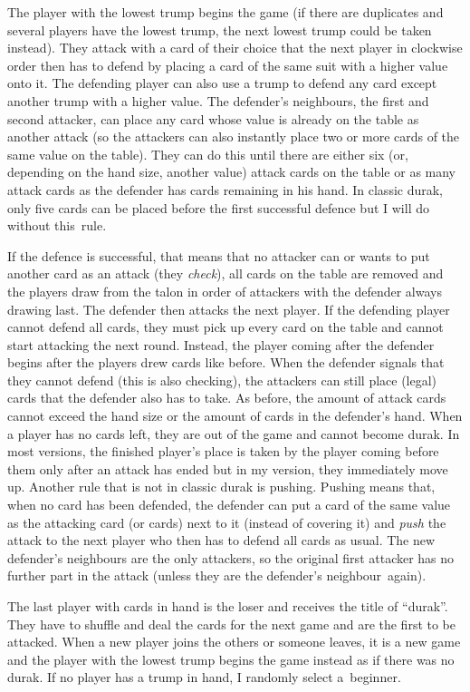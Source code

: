 \documentclass[a4paper,titlepage]{article}
\begin{document}
The player with the lowest trump begins the game (if there are duplicates and several players have the lowest trump, the next lowest trump could be taken instead). They attack with a card of their choice that the next player in clockwise order then has to defend by placing a card of the same suit with a higher value onto it. The defending player can also use a trump to defend any card except another trump with a higher value. The defender's neighbours, the first and second attacker, can place any card whose value is already on the table as another attack (so the attackers can also instantly place two or more cards of the same value on the table). They can do this until there are either six (or, depending on the hand size, another value) attack cards on the table or as many attack cards as the defender has cards remaining in his hand. In classic durak, only five cards can be placed before the first successful defence but I will do without this~rule.

If the defence is successful, that means that no attacker can or wants to put another card as an attack (they \emph{check}), all cards on the table are removed and the players draw from the talon in order of attackers with the defender always drawing last. The defender then attacks the next player.
If the defending player cannot defend all cards, they must pick up every card on the table and cannot start attacking the next round. Instead, the player coming after the defender begins after the players drew cards like before. When the defender signals that they cannot defend (this is also checking), the attackers can still place (legal) cards that the defender also has to take. As before, the amount of attack cards cannot exceed the hand size or the amount of cards in the defender's hand.
When a player has no cards left, they are out of the game and cannot become durak. In most versions, the finished player's place is taken by the player coming before them only after an attack has ended but in my version, they immediately move up.
Another rule that is not in classic durak is pushing. Pushing means that, when no card has been defended, the defender can put a card of the same value as the attacking card (or cards) next to it (instead of covering it) and \emph{push} the attack to the next player who then has to defend all cards as usual. The new defender's neighbours are the only attackers, so the original first attacker has no further part in the attack (unless they are the defender's neighbour~again).

The last player with cards in hand is the loser and receives the title of ``durak''. They have to shuffle and deal the cards for the next game and are the first to be attacked. When a new player joins the others or someone leaves, it is a new game and the player with the lowest trump begins the game instead as if there was no durak. If no player has a trump in hand, I randomly select a~beginner. \medskip
\end{document}
